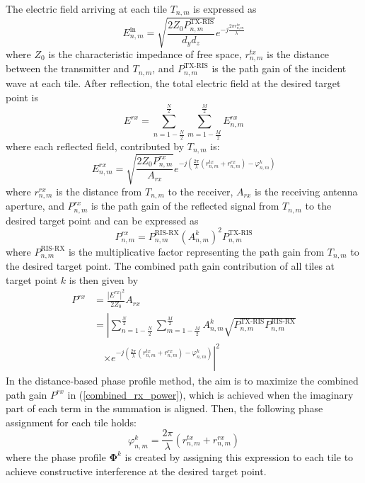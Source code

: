 \documentclass{IEEEoj}
\begin{document}
The electric field arriving at each tile $T_{n,m}$ is expressed as
\begin{equation}
	E_{n,m}^{\text{in}} = \sqrt{\frac{2 Z_0 P_{n,m}^{\text{TX-RIS}}}{d_y d_z}} e^{-j \frac{2 \pi r_{n,m}^{tx}}{\lambda}}
\end{equation}
where $Z_0$ is the characteristic impedance of free space, $r_{n,m}^{tx}$ is the distance between the transmitter and $T_{n,m}$, and $P_{n,m}^{\text{TX-RIS}}$ is the path gain of the incident wave at each tile. After reflection, the total electric field at the desired target point is
\begin{equation}
	E^{rx} = \sum_{n=1-\frac{N}{2}}^{\frac{N}{2}} \sum_{m=1-\frac{M}{2}}^{\frac{M}{2}} E_{n,m}^{rx}
\end{equation}
where each reflected field, contributed by $T_{n,m}$ is:
\begin{equation} \label{E_n_m_r}
	E_{n,m}^{rx} = \sqrt{\frac{2 Z_0 P^{rx}_{n,m}}{A_{rx}}} e^{-j \left(\frac{2 \pi}{\lambda} (r_{n,m}^{tx} + r_{n,m}^{rx}) - \varphi_{n,m}^k\right)}
\end{equation}
where $r_{n,m}^{rx}$ is the distance from $T_{n,m}$ to the receiver, $A_{rx}$ is the receiving antenna aperture, and $P_{n,m}^{rx}$ is the path gain of the reflected signal from $T_{n,m}$ to the desired target point and can be expressed as
\begin{equation}
	P_{n,m}^{rx} = P_{n,m}^{\text{RIS-RX}} (A_{n,m}^k)^2 P_{n,m}^{\text{TX-RIS}}
\end{equation}
where $P_{n,m}^{\text{RIS-RX}}$ is the multiplicative factor representing the path gain from $T_{n,m}$ to the desired target point. The combined path gain contribution of all tiles at target point $k$ is then given by
\begin{equation} \label{combined_rx_power}
	\begin{aligned}
		P^{rx} &= \frac{\left|E^{rx}\right|^2}{2 Z_0} A_{rx} \\
		&= \left| \sum_{n=1-\frac{N}{2}}^{\frac{N}{2}} \sum_{m=1-\frac{M}{2}}^{\frac{M}{2}} A_{n,m}^k \sqrt{P_{n,m}^{\text{TX-RIS}} P_{n,m}^{\text{RIS-RX}}} \right. \\
		&\quad \left. \times e^{-j \left(\frac{2 \pi}{\lambda} (r_{n,m}^{tx} + r_{n,m}^{rx}) - \varphi_{n,m}^k\right)} \right|^2
	\end{aligned}
\end{equation}
In the distance-based phase profile method, the aim is to maximize the combined path gain $P^{rx}$ in (\ref{combined_rx_power}), which is achieved when the imaginary part of each term in the summation is aligned. Then, the following phase assignment for each tile holds:
\begin{equation}
	\varphi_{n,m}^k = \frac{2 \pi}{\lambda} (r_{n,m}^{tx} + r_{n,m}^{rx})
\end{equation}
where the phase profile $\mathbf{\Phi}^k$ is created by assigning this expression to each tile to achieve constructive interference at the desired target point.
\end{document}
